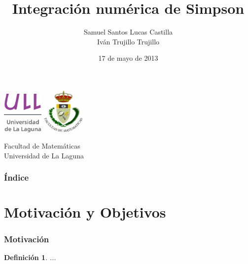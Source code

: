 \documentclass{beamer}
\title[Método Simpson]{Integración numérica de Simpson}
\author[Samuel e Iván]{Samuel Santos Lucas Castilla \\
                       Iván Trujillo Trujillo}
\institute[ULL]{Universidad de La Laguna}
\date[17-05-2013]{17 de mayo de 2013}
\newtheorem{definicion}{Definición}
\begin{document}
  
\begin{frame}

  \includegraphics[width=0.15\textwidth]{img/ullesc.eps}
  \hspace*{7.5cm}
  \includegraphics[width=0.16\textwidth]{img/fmatesc.eps}
  \titlepage

  \begin{scriptsize}
    \begin{center}
     Facultad de Matemáticas \\
     Universidad de La Laguna
    \end{center}
  \end{scriptsize}

\end{frame}

\begin{frame}
  \frametitle{Índice}  
  \tableofcontents[pausesections]
\end{frame}


\section{Motivación y Objetivos}


\begin{frame}

\frametitle{Motivación}

\begin{definicion}
...
\end{definicion}

\end{frame}
\end{document}
